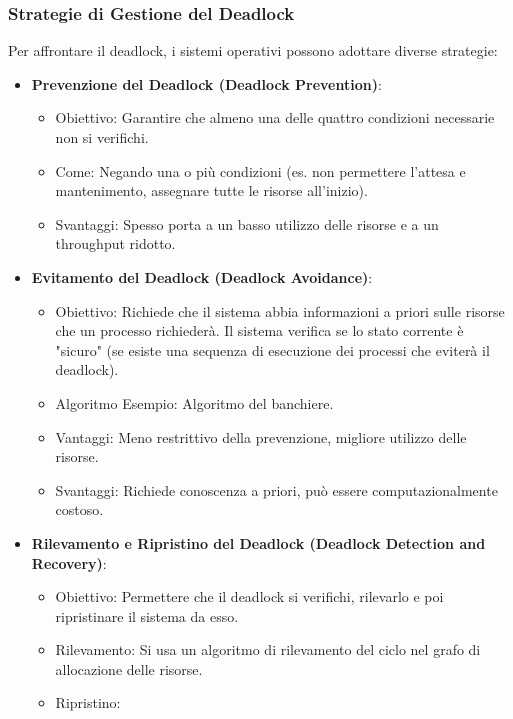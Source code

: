 \subsubsection{Strategie di Gestione del Deadlock}
Per affrontare il deadlock, i sistemi operativi possono adottare diverse strategie:
\begin{itemize}
    \item \textbf{Prevenzione del Deadlock (Deadlock Prevention)}:
        \begin{itemize} %
            \item Obiettivo: Garantire che almeno una delle quattro condizioni necessarie non si verifichi.
            \item Come: Negando una o più condizioni (es. non permettere l'attesa e mantenimento, assegnare tutte le risorse all'inizio).
            \item Svantaggi: Spesso porta a un basso utilizzo delle risorse e a un throughput ridotto.
        \end{itemize} %
    \item \textbf{Evitamento del Deadlock (Deadlock Avoidance)}:
        \begin{itemize} %
            \item Obiettivo: Richiede che il sistema abbia informazioni a priori sulle risorse che un processo richiederà. Il sistema verifica se lo stato corrente è "sicuro" (se esiste una sequenza di esecuzione dei processi che eviterà il deadlock).
            \item Algoritmo Esempio: Algoritmo del banchiere.
            \item Vantaggi: Meno restrittivo della prevenzione, migliore utilizzo delle risorse.
            \item Svantaggi: Richiede conoscenza a priori, può essere computazionalmente costoso.
        \end{itemize} %
    \item \textbf{Rilevamento e Ripristino del Deadlock (Deadlock Detection and Recovery)}:
        \begin{itemize} %
            \item Obiettivo: Permettere che il deadlock si verifichi, rilevarlo e poi ripristinare il sistema da esso.
            \item Rilevamento: Si usa un algoritmo di rilevamento del ciclo nel grafo di allocazione delle risorse.
            \item Ripristino:

\end{itemize}
\end{itemize}
